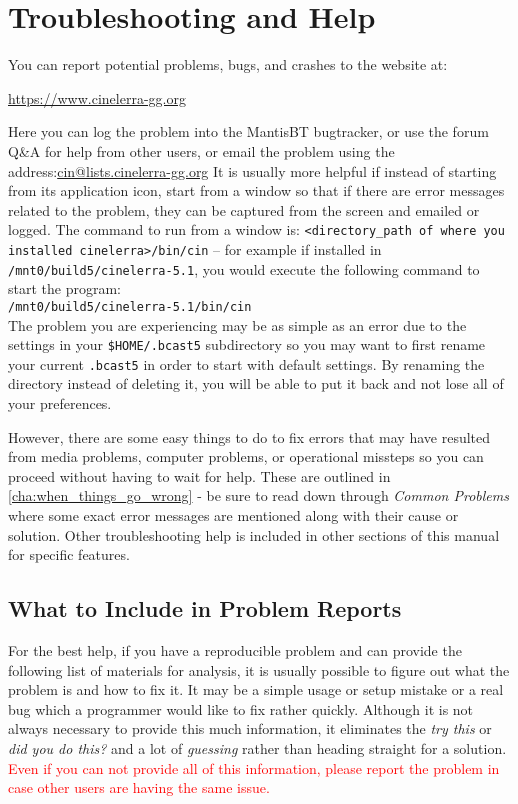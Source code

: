 \chapter{Troubleshooting and Help}%
\label{cha:troubleshooting_help}

You can report potential problems, bugs, and crashes to the \CGG{} website at:

\begin{center}
	\href{https://www.cinelerra-gg.org/}{https://www.cinelerra-gg.org}
\end{center}

Here you can log the problem into the MantisBT bugtracker, or use the forum Q\&A for help from other users, or email the
problem using the address:{\small \href{mailto:cin@lists.cinelerra-gg.org}{cin@lists.cinelerra-gg.org}} It is usually more
helpful if instead of starting \CGG{} from its application icon, start from a window so that if there are error
messages related to the problem, they can be captured from the screen and emailed or logged. The command to run
from a window is: \texttt{<directory\_path of where you installed cinelerra>/bin/cin} -- for example if
installed in \texttt{/mnt0/build5/cinelerra-5.1}, you would execute the following command to start the program:\\
\texttt{/mnt0/build5/cinelerra-5.1/bin/cin} \\
The problem you are experiencing may be as simple as an error due to the settings in your \texttt{\$HOME/.bcast5} subdirectory so you may want to first rename your current \texttt{.bcast5} in order to start with default settings. By renaming the directory instead of deleting it, you will be able to put it back and not lose all of your preferences.

However, there are some easy things to do to fix errors that may have resulted from media problems,
computer problems, or operational missteps so you can proceed without having to wait for help.  These
are outlined in \ref{cha:when_things_go_wrong} - be sure to read down through
\textit{Common Problems} where some exact error messages are mentioned along with their cause or solution.  Other 
troubleshooting help is included in other sections of this manual for specific features.

\section{What to Include in Problem Reports}%
\label{cha:include_in_problem_reports}
For the best help, if you have a reproducible problem and can provide the following list of materials for analysis, it
is usually possible to figure out what the problem is and how to fix it. It may be a simple usage or setup mistake or
a real bug which a programmer would like to fix rather quickly. Although it is not always necessary to provide this
much information, it eliminates the \textit{try this} or \textit{did you do this?} and a lot of \textit{guessing} rather than heading straight for a solution. \textcolor{red}{Even if you can not provide all of this information, please report the problem in case other users are having the same issue.}

